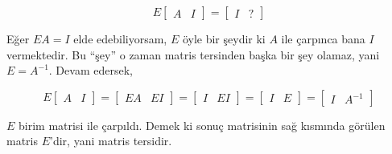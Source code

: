\documentclass[12pt,fleqn]{article}\usepackage{../../common}
\begin{document}
$$ E \left[\begin{array}{rr}A & I\end{array}\right] = 
\left[\begin{array}{rr}I & ?\end{array}\right]
$$

Eğer $EA = I$ elde edebiliyorsam, $E$ öyle bir şeydir ki $A$ ile çarpınca
bana $I$ vermektedir. Bu ``şey'' o zaman matris tersinden başka bir şey
olamaz, yani $E = A^{-1}$. Devam edersek,

$$ E \left[\begin{array}{rr}A & I\end{array}\right] = 
\left[\begin{array}{rr}EA & EI\end{array}\right] =
\left[\begin{array}{rr}I & EI\end{array}\right] =
\left[\begin{array}{rr}I & E\end{array}\right] =
\left[\begin{array}{rr}I & A^{-1}\end{array}\right]
$$

$E$ birim matrisi ile çarpıldı. Demek ki sonuç matrisinin sağ kısmında
görülen matris $E$'dir, yani matris tersidir.
\end{document}
